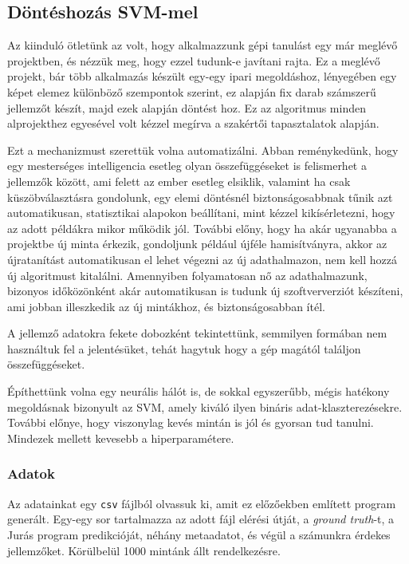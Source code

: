 \subsection{Döntéshozás SVM-mel}

Az kiinduló ötletünk az volt, hogy alkalmazzunk gépi tanulást egy már meglévő projektben,
és nézzük meg, hogy ezzel tudunk-e javítani rajta. Ez a meglévő projekt, bár több 
alkalmazás készült egy-egy ipari megoldáshoz, lényegében egy képet elemez 
különböző szempontok szerint, ez alapján fix darab számszerű jellemzőt készít, 
majd ezek alapján döntést hoz. Ez az algoritmus minden alprojekthez egyesével
volt kézzel megírva a szakértői tapasztalatok alapján. 

Ezt a mechanizmust szerettük volna automatizálni. Abban reménykedünk, hogy egy 
mesterséges intelligencia esetleg olyan összefüggéseket is felismerhet a jellemzők
között, ami felett az ember esetleg elsiklik, valamint ha csak küszöbválasztásra
gondolunk, egy elemi döntésnél biztonságosabbnak tűnik azt automatikusan, statisztikai
alapokon beállítani, mint kézzel kikísérletezni, hogy az adott példákra mikor működik jól.
További előny, hogy ha akár ugyanabba a projektbe új minta érkezik, gondoljunk például újféle 
hamisítványra, akkor az újratanítást automatikusan el lehet végezni az új adathalmazon,
nem kell hozzá új algoritmust kitalálni. Amennyiben folyamatosan nő az adathalmazunk, 
bizonyos időközönként akár automatikusan is tudunk új szoftververziót készíteni,
ami jobban illeszkedik az új mintákhoz, és biztonságosabban ítél.


A jellemző adatokra fekete dobozként tekintettünk, semmilyen formában nem használtuk fel
a jelentésüket, tehát hagytuk hogy a gép magától találjon összefüggéseket.


Építhettünk volna egy neurális hálót is, de sokkal egyszerűbb, mégis hatékony
megoldásnak bizonyult az SVM, amely kiváló ilyen bináris adat-klaszterezésekre.
További előnye, hogy viszonylag kevés mintán is jól és gyorsan tud tanulni.
Mindezek mellett kevesebb a hiperparamétere.


\subsubsection{Adatok}
\label{sec:adatok}

Az adatainkat egy \texttt{csv} fájlból olvassuk ki, amit ez előzőekben említett program 
generált. Egy-egy sor tartalmazza az adott fájl elérési útját, a \textit{ground truth}-t,
a Jurás program predikcióját, néhány metaadatot, és végül a számunkra érdekes jellemzőket.
Körülbelül 1000 mintánk állt rendelkezésre.


